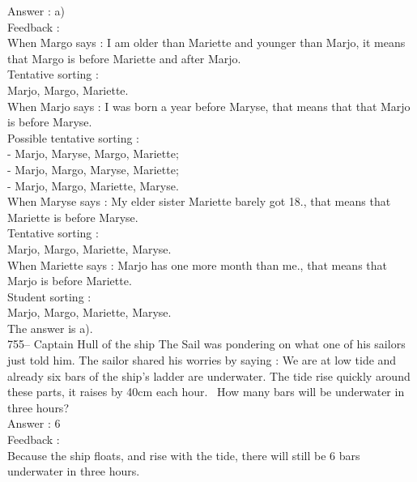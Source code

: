 \documentclass[letterpaper, 12pt]{article}
\begin{document}
Answer : a)\\

Feedback : \\
When Margo says : \og I am older than Mariette and younger than Marjo\fg , it means that Margo is before Mariette and after Marjo.\\

Tentative sorting :\\
Marjo, Margo, Mariette.\\

When Marjo says : \og I was born a year before Maryse\fg , that means that that Marjo is before Maryse.\\

Possible tentative sorting :\\
- Marjo, Maryse, Margo, Mariette;\\
- Marjo, Margo, Maryse, Mariette;\\
- Marjo, Margo, Mariette, Maryse.\\

When Maryse says : \og My elder sister Mariette barely got 18.\fg , that means that Mariette is before Maryse.\\

Tentative sorting :\\
Marjo, Margo, Mariette, Maryse.\\

When Mariette says : \og Marjo has one more month than me.\fg ,
that means that Marjo is before Mariette.\\

Student sorting :\\
Marjo, Margo, Mariette, Maryse.\\

The answer is a).\\

755-- Captain Hull of the ship The Sail was pondering on what one of his sailors just told him. The sailor shared his worries by saying : 
\og We are at low tide and already six bars of the ship's ladder are underwater. The tide rise quickly around these parts, it raises by 40cm each hour. \fg\  How many bars will be underwater in three hours?\\


Answer : 6\\

Feedback : \\
Because the ship floats, and rise with the tide, there will still be 6 bars underwater in three hours.\\
\end{document}

